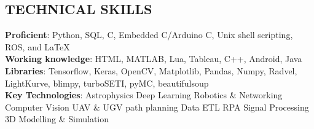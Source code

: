 \documentclass[11pt]{res} %
\newcommand{\titlegap}{5pt} %
\newcommand{\sectgap}{0.05in} %
\newcommand{\censectgap}{-.05in}
\begin{document}
\begin{resume}







\section{TECHNICAL SKILLS}

\vspace{0.1in} 

\textbf{Proficient}: Python, SQL, C, Embedded C/Arduino C, Unix shell scripting, ROS, and \LaTeX \vspace{0.05in}\\
\textbf{Working knowledge}: HTML, MATLAB, Lua, Tableau, C++, Android, Java
\vspace{0.05in}\\
\textbf{Libraries}: Tensorflow, Keras, OpenCV, Matplotlib, Pandas, Numpy, Radvel, LightKurve, blimpy, turboSETI, pyMC, beautifulsoup
\vspace{0.05in}\\
\textbf{Key Technologies}: \textbullet{} Astrophysics \textbullet{} Deep Learning \textbullet{} Robotics \& Networking \textbullet{} Computer Vision \textbullet{} UAV \& UGV path planning \textbullet{} Data ETL \textbullet{} RPA \textbullet{} Signal Processing \textbullet{} 3D Modelling \& Simulation
\vspace{\sectgap}
\hline








\end{resume} 
\end{document}
